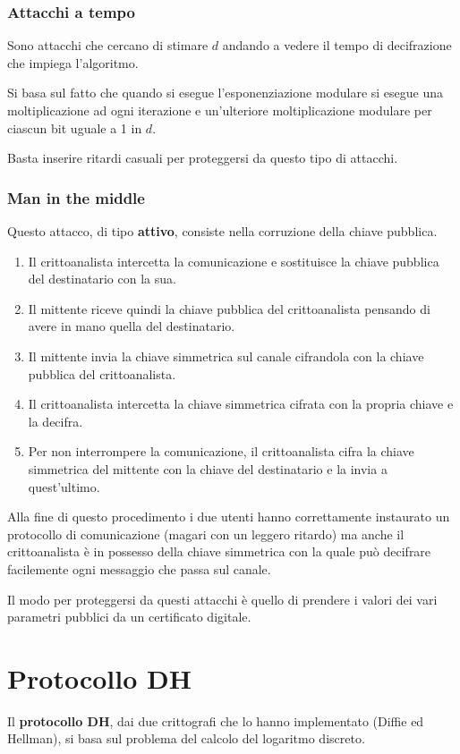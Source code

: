 \subsubsection{Attacchi a tempo}
Sono attacchi che cercano di stimare $d$ andando a vedere il tempo di decifrazione che impiega l'algoritmo.

Si basa sul fatto che quando si esegue l'esponenziazione modulare si esegue una moltiplicazione ad ogni iterazione
e un'ulteriore moltiplicazione modulare per ciascun bit uguale a 1 in $d$.

Basta inserire ritardi casuali per proteggersi da questo tipo di attacchi.

\subsubsection{Man in the middle}
Questo attacco, di tipo \textbf{attivo}, consiste nella corruzione della chiave pubblica.
\begin{enumerate}
	\item Il crittoanalista intercetta la comunicazione e sostituisce la chiave pubblica del destinatario con la
	      sua.
	\item Il mittente riceve quindi la chiave pubblica del crittoanalista pensando di avere in mano quella del
	      destinatario.
	\item Il mittente invia la chiave simmetrica sul canale cifrandola con la chiave pubblica del crittoanalista.
	\item Il crittoanalista intercetta la chiave simmetrica cifrata con la propria chiave e la decifra.
	\item Per non interrompere la comunicazione, il crittoanalista cifra la chiave simmetrica del mittente con la
	      chiave del destinatario e la invia a quest'ultimo.
\end{enumerate}
Alla fine di questo procedimento i due utenti hanno correttamente instaurato un protocollo di comunicazione (magari
con un leggero ritardo) ma anche il crittoanalista \`e in possesso della chiave simmetrica con la quale pu\`o
decifrare facilemente ogni messaggio che passa sul canale.

Il modo per proteggersi da questi attacchi \`e quello di prendere i valori dei vari parametri pubblici da un
certificato digitale.

\section{Protocollo DH}
Il \textbf{protocollo DH}, dai due crittografi che lo hanno implementato (Diffie ed Hellman), si basa sul problema
del calcolo del logaritmo discreto.

